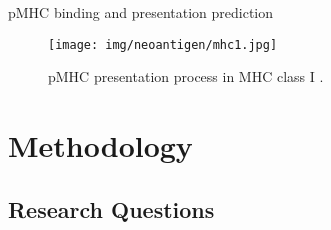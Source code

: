 \documentclass[10pt]{beamer}
\newcommand{\1}{
	\setbeamertemplate{background}{
		\texttt{[image: img/1]}
		\tikz[overlay] \fill[fill opacity=0.75,fill=white] (0,0) rectangle (-\paperwidth,\paperheight);
	}
}
\begin{document}
\begin{frame}{pMHC binding and presentation prediction}{}		
	\begin{figure}[H]
		\centering
		\texttt{[image: img/neoantigen/mhc1.jpg]}
		\caption{pMHC presentation process in MHC class I \cite{zhang2019application}.}
		\label{fig:mhc1}
	\end{figure}	
\end{frame}








\section{Methodology}

\subsection{Research Questions}
\end{document}
